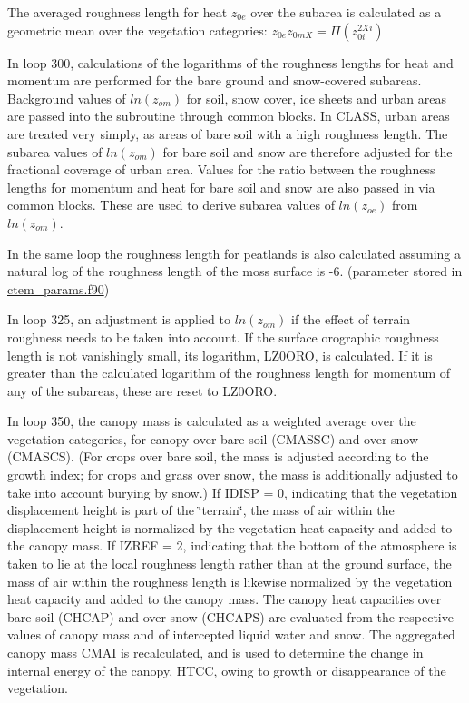 The averaged roughness length for heat $z_{0e}$ over the subarea is calculated as a geometric mean over the vegetation categories\+: $z_{0e} z_{0mX} = \Pi ( z_{0i}^{2Xi} )$

In loop 300, calculations of the logarithms of the roughness lengths for heat and momentum are performed for the bare ground and snow-\/covered subareas. Background values of $ln(z_{om})$ for soil, snow cover, ice sheets and urban areas are passed into the subroutine through common blocks. In C\+L\+A\+S\+S, urban areas are treated very simply, as areas of bare soil with a high roughness length. The subarea values of $ln(z_{om})$ for bare soil and snow are therefore adjusted for the fractional coverage of urban area. Values for the ratio between the roughness lengths for momentum and heat for bare soil and snow are also passed in via common blocks. These are used to derive subarea values of $ln(z_{oe})$ from $ln(z_{om})$.

In the same loop the roughness length for peatlands is also calculated assuming a natural log of the roughness length of the moss surface is -\/6. (parameter stored in \hyperlink{ctem__params_8f90}{ctem\+\_\+params.\+f90})

In loop 325, an adjustment is applied to $ln(z_{om})$ if the effect of terrain roughness needs to be taken into account. If the surface orographic roughness length is not vanishingly small, its logarithm, L\+Z0\+O\+R\+O, is calculated. If it is greater than the calculated logarithm of the roughness length for momentum of any of the subareas, these are reset to L\+Z0\+O\+R\+O.

In loop 350, the canopy mass is calculated as a weighted average over the vegetation categories, for canopy over bare soil (C\+M\+A\+S\+S\+C) and over snow (C\+M\+A\+S\+C\+S). (For crops over bare soil, the mass is adjusted according to the growth index; for crops and grass over snow, the mass is additionally adjusted to take into account burying by snow.) If I\+D\+I\+S\+P = 0, indicating that the vegetation displacement height is part of the \char`\"{}terrain\char`\"{}, the mass of air within the displacement height is normalized by the vegetation heat capacity and added to the canopy mass. If I\+Z\+R\+E\+F = 2, indicating that the bottom of the atmosphere is taken to lie at the local roughness length rather than at the ground surface, the mass of air within the roughness length is likewise normalized by the vegetation heat capacity and added to the canopy mass. The canopy heat capacities over bare soil (C\+H\+C\+A\+P) and over snow (C\+H\+C\+A\+P\+S) are evaluated from the respective values of canopy mass and of intercepted liquid water and snow. The aggregated canopy mass C\+M\+A\+I is recalculated, and is used to determine the change in internal energy of the canopy, H\+T\+C\+C, owing to growth or disappearance of the vegetation.

